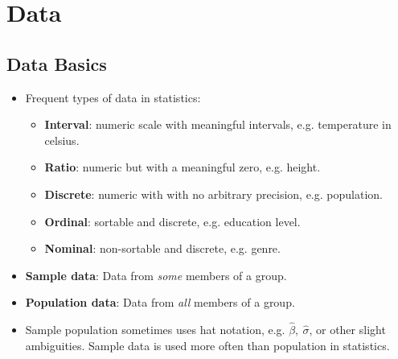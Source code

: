 \documentclass[12pt,a4paper]{article}
\begin{document}
\tableofcontents
\cleardoublepage
\fancyhead{}


\clearpage
\section{Data}
\subsection{Data Basics}
\begin{itemize}
    \item Frequent types of data in statistics:
        \begin{itemize}
            \item \textbf{Interval}: numeric scale with meaningful intervals, e.g. temperature in celsius.
            \item \textbf{Ratio}: numeric but with a meaningful zero, e.g. height.
            \item \textbf{Discrete}: numeric with with no arbitrary precision, e.g. population.
            \item \textbf{Ordinal}: sortable and discrete, e.g. education level.
            \item \textbf{Nominal}: non-sortable and discrete, e.g. genre.
        \end{itemize}
    \item \textbf{Sample data}: Data from \textit{some} members of a group.
    \item \textbf{Population data}: Data from \textit{all} members of a group.
    \item Sample population sometimes uses hat notation, e.g. \(\hat{\beta},~\hat{\sigma}\), or other slight ambiguities. Sample data is used more often than population in statistics.
\end{itemize}
\end{document}
